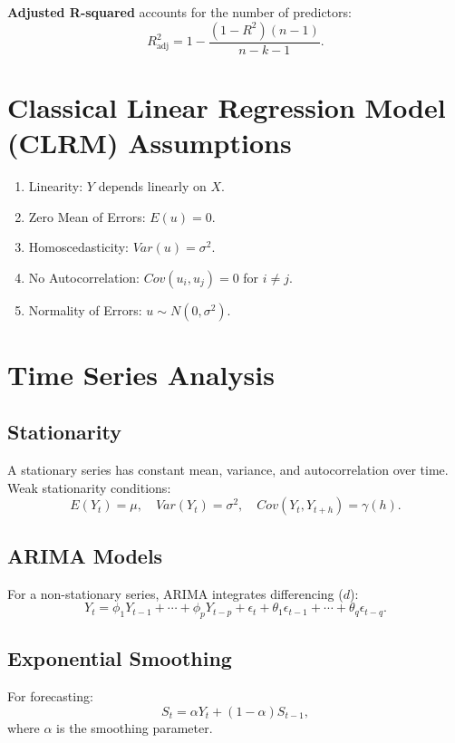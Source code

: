 \documentclass{article}
\begin{document}
\textbf{Adjusted R-squared} accounts for the number of predictors:
\begin{equation}
    R^2_{\text{adj}} = 1 - \frac{(1 - R^2)(n - 1)}{n - k - 1}.
\end{equation}

\section{Classical Linear Regression Model (CLRM) Assumptions}
\begin{enumerate}
    \item Linearity: $Y$ depends linearly on $X$.
    \item Zero Mean of Errors: $E(u) = 0$.
    \item Homoscedasticity: $Var(u) = \sigma^2$.
    \item No Autocorrelation: $Cov(u_i, u_j) = 0$ for $i \neq j$.
    \item Normality of Errors: $u \sim N(0, \sigma^2)$.
\end{enumerate}

\section{Time Series Analysis}
\subsection{Stationarity}
A stationary series has constant mean, variance, and autocorrelation over time. Weak stationarity conditions:
\begin{equation}
    E(Y_t) = \mu, \quad Var(Y_t) = \sigma^2, \quad Cov(Y_t, Y_{t+h}) = \gamma(h).
\end{equation}

\subsection{ARIMA Models}
For a non-stationary series, ARIMA integrates differencing ($d$):
\begin{equation}
    Y_t = \phi_1 Y_{t-1} + \cdots + \phi_p Y_{t-p} + \epsilon_t + \theta_1\epsilon_{t-1} + \cdots + \theta_q\epsilon_{t-q}.
\end{equation}

\subsection{Exponential Smoothing}
For forecasting:
\begin{equation}
    S_t = \alpha Y_t + (1 - \alpha) S_{t-1},
\end{equation}
where $\alpha$ is the smoothing parameter.
\end{document}
